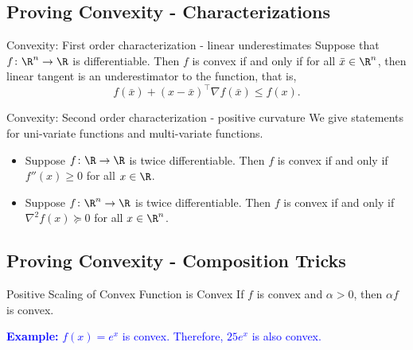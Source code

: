 \subsection{Proving Convexity - Characterizations}

\begin{theorem}{Convexity: First order characterization - linear underestimates}{}{}
Suppose that $f\colon \R^n \to \R$ is differentiable.  Then $f$ is convex if and only if for all $\bar x \in \R^n$, then linear tangent is an underestimator to the function, that is,
$$
f(\bar x) + (x - \bar x)^\top \nabla f(\bar x) \leq f(x).
$$
\end{theorem}

\begin{figure}[H]
\begin{center}
\footnotemark
\end{center}
\end{figure}



\begin{theorem}{Convexity: Second order characterization - positive curvature}{}
We give statements for uni-variate functions and multi-variate functions.
\begin{itemize}
\item Suppose $f \colon \R \to \R$ is twice differentiable.  Then $f$ is convex if and only if $f''(x) \geq 0$ for all $x \in \R$.
\item Suppose $f \colon \R^n \to \R$ is twice differentiable.  Then $f$ is convex if and only if $\nabla^2 f(x) \succcurlyeq 0$ for all $x \in \R^n$.
\end{itemize}
\end{theorem}


\subsection{Proving Convexity - Composition Tricks}


\begin{general}{Positive Scaling of Convex Function is Convex}{}
If $f$ is convex and $\alpha > 0$, then $\alpha f$ is convex. 

\textcolor{blue}{\textbf{Example: } $f(x) = e^x$ is convex.  Therefore, $25 e^x$ is also convex.}
\end{general}

